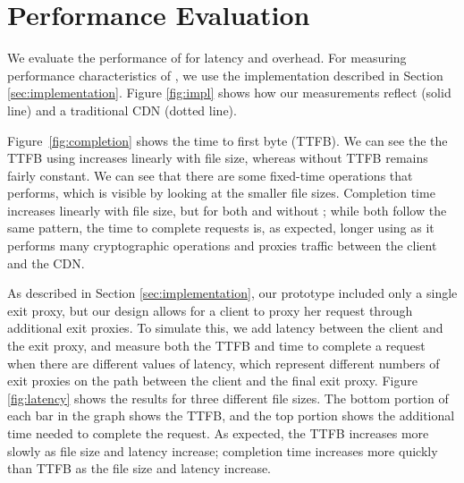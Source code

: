 

\section{Performance Evaluation}
\label{sec:performance}
We evaluate the performance 
of \system{} for latency and overhead. For measuring performance characteristics of \system{}, we use the implementation 
described in Section \ref{sec:implementation}.  Figure \ref{fig:impl} shows 
how our measurements reflect \system{} (solid line) and a traditional CDN (dotted 
line).  

Figure~\ref{fig:completion} shows the time to first byte (TTFB).  We can see the the TTFB using \system{} increases linearly with
file size, whereas without \system{} TTFB remains fairly constant.  We can see that there are some fixed-time operations that \system{} performs, which
is visible by looking at the smaller file sizes. Completion time increases linearly
with file size, but for both \system{} and without \system{}; while both follow the
same pattern, the time to complete requests is, as expected, longer using \system{} as it performs many cryptographic operations and proxies traffic between the client and the CDN.



As described in Section \ref{sec:implementation}, our prototype included only a single exit proxy, but 
our design allows for a client to proxy her request through additional exit proxies.  To simulate this, we 
add latency between the client and the exit proxy, and measure both the TTFB and time to complete a request 
when there are different values of latency, which represent different numbers of exit proxies on the path between the 
client and the final exit proxy.  Figure \ref{fig:latency} shows the results for three different file sizes. The 
bottom portion of each bar in the graph shows the TTFB, and the top portion shows the additional time needed 
to complete the request.  As expected, the TTFB increases more slowly as file size
and latency increase; completion time
increases more quickly than TTFB as the file size and latency increase.   

